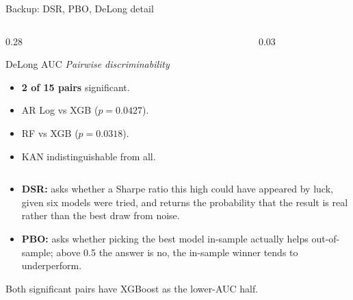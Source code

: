 \documentclass[aspectratio=169, t]{beamer}
\begin{document}
\begin{frame}{Backup: DSR, PBO, DeLong detail}
\begin{columns}[T]
\begin{column}{0.28\textwidth}
{
\begin{block}{DeLong AUC}
\footnotesize
\textit{Pairwise discriminability}
\begin{itemize}\setlength{\itemsep}{0pt}
  \item \textbf{2 of 15 pairs} significant.
  \item AR Log vs XGB ($p=0.0427$).
  \item RF vs XGB ($p=0.0318$).
  \item KAN indistinguishable from all.
\end{itemize}
\end{block}
}
\end{column}
\begin{column}{0.03\textwidth}\hfill\end{column}
\end{columns}

\vspace{1.0em}

\begin{itemize}\scriptsize\setlength{\itemsep}{4pt}
  \item \textbf{DSR:} asks whether a Sharpe ratio this high could have appeared by luck, given six models were tried, and returns the probability that the result is real rather than the best draw from noise.
  \item \textbf{PBO:} asks whether picking the best model in-sample actually helps out-of-sample; above 0.5 the answer is no, the in-sample winner tends to underperform.
\end{itemize}

\vspace{0.5em}
\centering
{\footnotesize Both significant pairs have XGBoost as the lower-AUC half.}
\end{frame}
\end{document}
